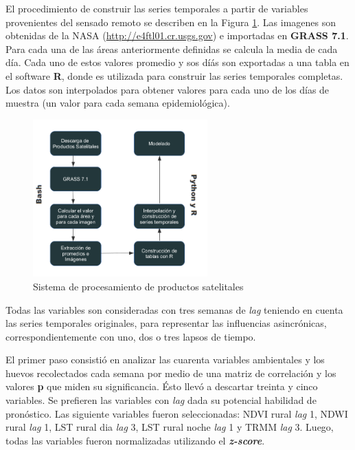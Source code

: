   \par El procedimiento de construir las series temporales a partir de variables
    provenientes del sensado remoto se describen en la Figura \ref{fig:sistema}.
    Las imagenes son obtenidas de la NASA (\url{http://e4ftl01.cr.usgs.gov}) e
    importadas en \textbf{GRASS 7.1}. Para cada una de las áreas anteriormente
    definidas se calcula la media de cada día. Cada uno de estos valores
    promedio y sos díás son exportadas a una tabla en el software \textbf{R},
    donde es utilizada para construir las series temporales completas.
    Los datos son interpolados para obtener valores para cada uno de los
    días de muestra (un valor para cada semana epidemiológica).
    \begin{figure}[hbt]
    \centering%
    \includegraphics[width=0.6\textwidth]{images/sistema}%
    \caption{Sistema de procesamiento de productos satelitales}\label{fig:sistema}
    \end{figure}

  \par Todas las variables son consideradas con tres semanas de \textit{lag}
  teniendo en cuenta las series temporales originales, para representar las
  influencias asincrónicas, correspondientemente con uno, dos o tres
  lapsos de tiempo.

  \par El primer paso consistió en analizar las cuarenta variables ambientales
    y los huevos recolectados cada semana por medio de una matriz de correlación
    y los valores \textbf{p} que miden su significancia. Ésto llevó a descartar
    treinta y cinco variables. Se prefieren las variables con \textit{lag} dada
    su potencial habilidad de pronóstico. Las siguiente variables fueron
    seleccionadas: NDVI rural \textit{lag} 1, NDWI rural \textit{lag} 1, LST rural dia \textit{lag} 3,
    LST rural noche \textit{lag} 1 y TRMM \textit{lag} 3. Luego, todas las
    variables fueron normalizadas utilizando el \textbf{\textit{z-score}}.

